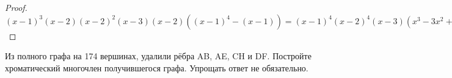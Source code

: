 \begin{proof}

    $(x-1)^{3}(x-2)(x-2)^{2}(x-3)(x-2)((x-1)^{4}-(x-1)) = (x-1)^{4}(x-2)^{4}(x-3)(x^{3}-3x^{2}+3x-1+1) = x(x-1)^{4}(x-2)^{4}(x-3)(x^{2}-3x+3)$

\end{proof}

\begin{problem}[12]

	Из полного графа на 174 вершинах, удалили рёбра AB, AE, CH и DF. Постройте хроматический многочлен получившегося графа. Упрощать ответ не обязательно.
    
\end{problem}

